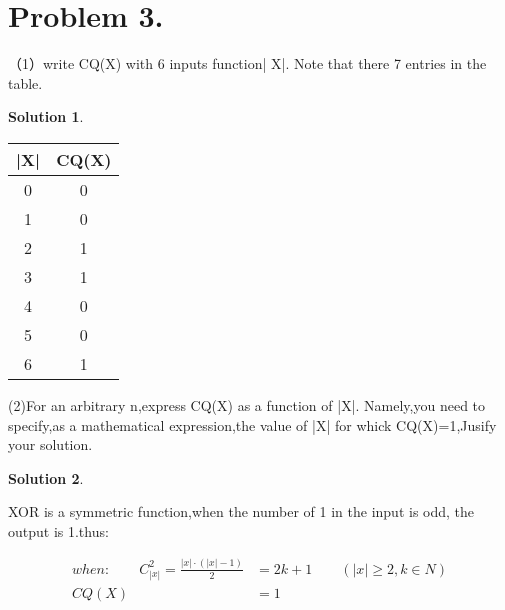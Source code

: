 \documentclass[UTF8,oneside]{article}
\newtheorem*{Solution}{Solution}
\begin{document}
\section*{Problem 3.}
（1）write CQ(X) with 6 inputs function|	X|. Note that there 7 entries in the table.\\
\begin{Solution}

\end{Solution}
	\begin{table}[h]
\centering
\begin{tabular}{|c|c|}
\hline
|X| & CQ(X)\\
\hline
0 & 0 \\
\hline
1 & 0	\\
\hline
2 & 1	\\
\hline
3 & 1 \\
\hline
4 & 0\\
\hline
5 & 0\\
\hline
6 & 1\\
\hline
\end{tabular}
\label{TAB1}
\end{table}
(2)For an arbitrary n,express CQ(X) as a function of |X|. Namely,you need to specify,as a mathematical expression,the value of |X| for whick CQ(X)=1,Jusify your solution. 
\begin{Solution}
\end{Solution}
XOR is a symmetric function,when the number of 1 in the input is odd, the output is 1.thus:
\begin{center}
\begin{align*}
when:\qquad C_{|x|}^{2}=\frac{|x|·(|x|-1)}{2}&=2k+1\qquad(|x|\geq2,k \in N)\\
CQ(X)&=1
\end{align*}
\end{center}


\end{document}
